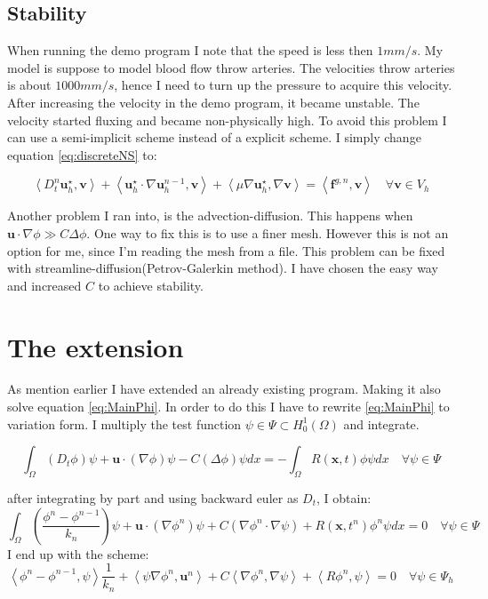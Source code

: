 \documentclass[12pt,a4paper,english]{article}
\begin{document}
\subsection*{Stability}
When running the demo program I note that the speed is less then $1 mm/s$. My model is suppose to model blood flow throw arteries. The velocities throw arteries is about $1000 mm/s$, hence I need to turn up the pressure to acquire this velocity. \\
After increasing the velocity in the demo program, it became unstable. The velocity started fluxing and became non-physically high. To avoid this problem I can use a semi-implicit scheme instead of a explicit scheme. I simply change equation \ref{eq:discreteNS} to:

$$\left\langle D^{n}_{t} \textbf{u}^{\star}_{h} , \textbf{v} \right\rangle + \left\langle \textbf{u}^{\star}_{h} \cdot \nabla \textbf{u}^{n-1}_{h} , \textbf{v} \right\rangle +  \left\langle \mu \nabla \textbf{u}^{\star}_{h} , \nabla \textbf{v} \right\rangle = \left\langle \textbf{f}^{g,n} , \textbf{v} \right\rangle \quad \forall \textbf{v} \in V_h$$


Another problem I ran into, is the advection-diffusion. This happens when $\textbf{u} \cdot \nabla \phi \gg C \Delta \phi$. One way to fix this is to use a finer mesh. However this is not an option for me, since I'm reading the mesh from a file. This problem can be fixed with streamline-diffusion(Petrov-Galerkin method). I have chosen the easy way and increased $C$ to achieve stability. 

\section*{The extension}
As mention earlier I have extended an already existing program. Making it also solve equation \ref{eq:MainPhi}. In order to do this I have to rewrite \ref{eq:MainPhi} to variation form. I multiply the test function $\psi \in \Psi \subset H^{1}_{0}\left( \Omega \right)$ and integrate.


$$
\int_{\Omega} \left( D_t \phi \right)\psi + \textbf{u}\cdot\left( \nabla \phi \right)\psi - C\left( \Delta\phi\right) \psi dx = - \int_{\Omega} R(\textbf{x}, t) \phi\psi dx \quad \forall \psi \in \Psi
$$


after integrating by part and using backward euler as $D_t$, I obtain:
$$
\int_{\Omega} \left( \frac{\phi^n - \phi^{n-1}}{k_n}\right) \psi + \textbf{u}\cdot\left( \nabla \phi^n \right)\psi + C\left( \nabla\phi^n \cdot \nabla \psi \right) + R\left( \textbf{x}, t^n \right) \phi^n \psi dx = 0 \quad \forall \psi \in \Psi
$$
I end up with the scheme:
\begin{equation}
\left\langle \phi^n -\phi^{n-1}, \psi \right\rangle \frac{1}{k_n} + \left\langle \psi \nabla \phi^n, \textbf{u}^n\right\rangle + C\left\langle \nabla \phi^n, \nabla \psi \right\rangle + \left\langle R\phi^n , \psi \right\rangle = 0 \quad \forall \psi \in \Psi_h
\label{eq:discretephi}
\end{equation}
\end{document}
